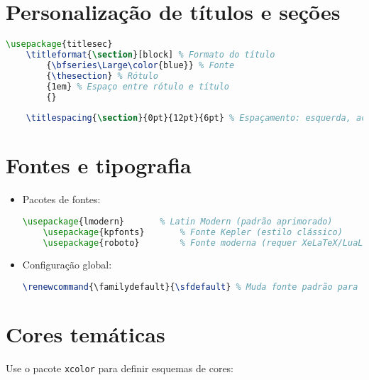 \section{Personalização de títulos e seções}

\begin{lstlisting}[language=tex, caption=Pacote \texttt{titlesec} para alterar títulos e seções]
    \usepackage{titlesec}
    \titleformat{\section}[block] % Formato do título
        {\bfseries\Large\color{blue}} % Fonte
        {\thesection} % Rótulo
        {1em} % Espaço entre rótulo e título
        {} 
    
    \titlespacing{\section}{0pt}{12pt}{6pt} % Espaçamento: esquerda, acima, abaixo
\end{lstlisting}  

\section{Fontes e tipografia}

\begin{itemize}
    \item Pacotes de fontes:
    \begin{lstlisting}[language=tex, caption=Pacotes de fontes mais usados]
    \usepackage{lmodern}       % Latin Modern (padrão aprimorado)
    \usepackage{kpfonts}       % Fonte Kepler (estilo clássico)
    \usepackage{roboto}        % Fonte moderna (requer XeLaTeX/LuaLaTeX)
    \end{lstlisting} 
    
    \item Configuração global:
    \begin{lstlisting}[language=tex, caption=Fonte padrão para o documento]
    \renewcommand{\familydefault}{\sfdefault} % Muda fonte padrão para sans-serif
    \end{lstlisting}      
\end{itemize}

\section{Cores temáticas}

Use o pacote \verb|xcolor| para definir esquemas de cores:


